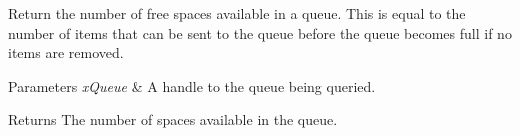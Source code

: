 Return the number of free spaces available in a queue. This is equal to the number of items that can be sent to the queue before the queue becomes full if no items are removed.


\begin{DoxyParams}{Parameters}
{\em x\+Queue} & A handle to the queue being queried.\\
\hline
\end{DoxyParams}
\begin{DoxyReturn}{Returns}
The number of spaces available in the queue. 
\end{DoxyReturn}
